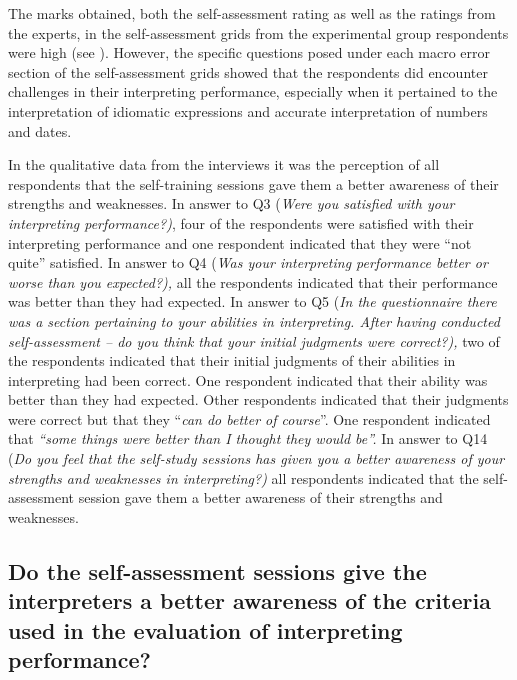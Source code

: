 \documentclass[output=paper]{langsci/langscibook}
\begin{document}
The marks obtained, both the self-assessment rating as well as the ratings from the experts, in the self-assessment grids from the experimental group respondents were high (see ). However, the specific questions posed under each macro error section of the self-assessment grids showed that the respondents did encounter challenges in their interpreting performance, especially when it pertained to the interpretation of idiomatic expressions and accurate interpretation of numbers and dates.  

In the qualitative data from the interviews it was the perception of all respondents that the self-training sessions gave them a better awareness of their strengths and weaknesses. In answer to Q3 (\textit{Were you satisfied with your interpreting performance?)}, four of the respondents were satisfied with their interpreting performance and one respondent indicated that they were “not quite” satisfied. In answer to Q4 (\textit{Was your interpreting performance better or worse than you expected?),} all the respondents indicated that their performance was better than they had expected. In answer to Q5 (\textit{In the questionnaire there was a section pertaining to your abilities in interpreting. After having conducted self-assessment – do you think that your initial judgments were correct?),} two of the respondents indicated that their initial judgments of their abilities in interpreting had been correct. One respondent indicated that their ability was better than they had expected. Other respondents indicated that their judgments were correct but that they “\textit{can do better of course}”. One respondent indicated that \textit{“some things were better than I thought they would be”.} In answer to Q14 (\textit{Do you feel that the self-study sessions has given you a better awareness of your strengths and weaknesses in interpreting?)} all respondents indicated that the self-assessment session gave them a better awareness of their strengths and weaknesses. 

\subsection{Do the self-assessment sessions give the interpreters a better awareness of the criteria used in the evaluation of interpreting performance?}
\end{document}
